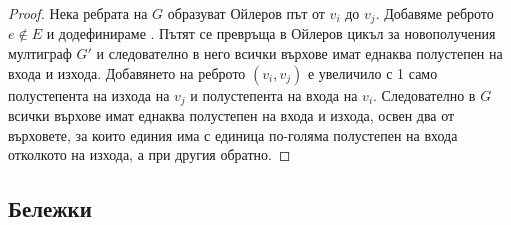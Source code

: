 \begin{proof}
    Нека ребрата на \(G\) образуват Ойлеров път от \(v_i\) до \(v_j\). Добавяме 
    реброто \(e \not \in E\) и додефинираме . Пътят се превръща в Ойлеров 
    цикъл за новополучения мултиграф \(G'\) и следователно в него всички върхове имат еднаква полустепен 
    на входа и изхода. Добавянето на реброто \((v_i, v_j)\) е увеличило с 1 само полустепента на изхода 
    на \(v_j\) и полустепента на входа на \(v_i\). Следователно в \(G\) всички върхове имат еднаква 
    полустепен на входа и изхода, освен два от върховете, за които единия има с единица по-голяма 
    полустепен на входа отколкото на изхода, а при другия обратно.
\end{proof}

\subsection*{Бележки}
